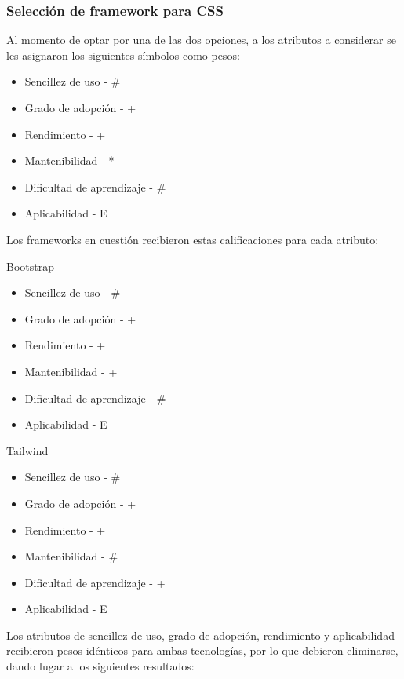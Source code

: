 \documentclass{article}
\begin{document}
\subsubsection{Selección de framework para CSS}
Al momento de optar por una de las dos opciones, a los atributos a considerar se les asignaron los siguientes símbolos como pesos:
\begin{itemize}
    \item Sencillez de uso - \#
    \item Grado de adopción - +
    \item Rendimiento - +
    \item Mantenibilidad - *
    \item Dificultad de aprendizaje - \#
    \item Aplicabilidad - E
\end{itemize}
Los frameworks en cuestión recibieron estas calificaciones para cada atributo:

Bootstrap
\begin{itemize}
    \item Sencillez de uso - \#
    \item Grado de adopción - +
    \item Rendimiento - +
    \item Mantenibilidad - +
    \item Dificultad de aprendizaje - \#
    \item Aplicabilidad - E
\end{itemize}
Tailwind
\begin{itemize}
    \item Sencillez de uso - \#
    \item Grado de adopción - +
    \item Rendimiento - +
    \item Mantenibilidad - \#
    \item Dificultad de aprendizaje - +
    \item Aplicabilidad - E
\end{itemize}
Los atributos de sencillez de uso, grado de adopción, rendimiento y aplicabilidad recibieron pesos idénticos para ambas tecnologías, por lo que debieron eliminarse, dando lugar a los siguientes resultados:
\end{document}

